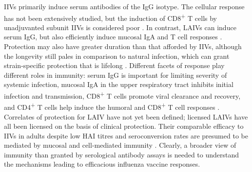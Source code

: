 \Glspl{IIV} primarily induce serum antibodies of the IgG isotype.
The cellular response has not been extensively studied,
but the induction of CD8\textsuperscript{+} T cells by unadjuvanted subunit \glspl{IIV} is considered poor \autocite{bresee2018InactivatedInfluenzaVaccines,koutsakos2018CirculatingFHCells}.
In contrast, \glspl{LAIV} can induce serum IgG, but also efficiently induce mucosal IgA and T cell responses \autocite{luke2018InfluenzaVaccineLive}.
Protection may also have greater duration than that afforded by \glspl{IIV}, 
although the longevity still pales in comparison to natural infection, which can grant strain-specific protection that is lifelong \autocite{houser2015InfluenzaVaccinesChallenges,bresee2018InactivatedInfluenzaVaccines,luke2018InfluenzaVaccineLive,krammer2019HumanAntibodyResponse}.
Different facets of response play different roles in immunity:
serum IgG is important for limiting severity of systemic infection, 
mucosal IgA in the upper respiratory tract inhibits initial infection and transmission, 
CD8\textsuperscript{+} T cells promote viral clearance and recovery,
and CD4\textsuperscript{+} T cells help induce the humoral and CD8\textsuperscript{+} T cell responses
\autocite{renegar2004RoleIgAIgG,sano2017RoadMoreEffective,krammer2018Influenza,bresee2018InactivatedInfluenzaVaccines}.
Correlates of protection for \gls{LAIV} have not yet been defined;
licensed \glspl{LAIV} have all been licensed on the basis of clinical protection.
Their comparable efficacy to \glspl{IIV} in adults despite low \gls{HAI} titres and seroconversion rates are presumed to be mediated by mucosal and cell-mediated immunity \autocite{luke2018InfluenzaVaccineLive,krammer2019HumanAntibodyResponse}.
%
Clearly, a broader view of immunity than granted by serological antibody assays is needed to understand the mechanisms leading to efficacious influenza vaccine responses.

